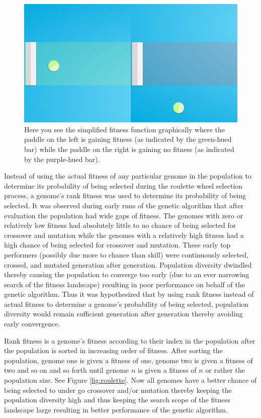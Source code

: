 \documentclass[a4paper,10pt]{article}
\begin{document}
\begin{figure}[H]  
  \centering
  \includegraphics[width=.5\textwidth]{figures/simple_fit_func.png}
  \caption{Here you see the simplified fitness function graphically where the paddle on the left is gaining fitness (as indicated by the green-hued bar) while the paddle on the right is gaining no fitness (as indicated by the purple-hued bar).}
  \label{fig:simple_fit_func}
\end{figure}

Instead of using the actual fitness of any particular genome in the population to determine its probability of being selected during the roulette wheel selection process, a genome's rank fitness was used to determine its probability of being selected. It was observed during early runs of the genetic algorithm that after evaluation the population had wide gaps of fitness. The genomes with zero or relatively low fitness had absolutely little to no chance of being selected for crossover and mutation while the genomes with a relatively high fitness had a high chance of being selected for crossover and mutation. These early top performers (possibly due more to chance than skill) were continuously selected, crossed, and mutated generation after generation. Population diversity dwindled thereby causing the population to converge too early (due to an ever narrowing search of the fitness landscape) resulting in poor performance on behalf of the genetic algorithm. Thus it was hypothesized that by using rank fitness instead of actual fitness to determine a genome's probability of being selected, population diversity would remain sufficient generation after generation thereby avoiding early convergence. 

Rank fitness is a genome's fitness according to their index in the population after the population is sorted in increasing order of fitness. After sorting the population, genome one is given a fitness of one, genome two is given a fitness of two and so on and so forth until genome $n$ is given a fitness of $n$ or rather the population size. See Figure \ref{fig:roulette}. Now all genomes have a better chance of being selected to under go crossover and/or mutation thereby keeping the population diversity high and thus keeping the search scope of the fitness landscape large resulting in better performance of the genetic algorithm.   
\end{document}
